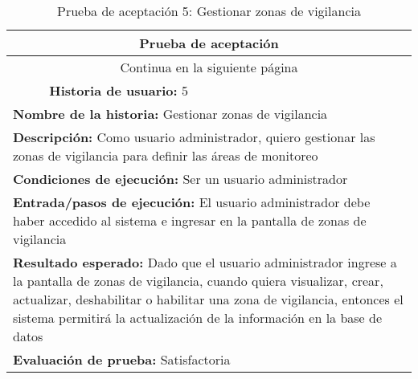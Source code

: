 \begin{longtable}{|p{6.7cm}|p{6.7cm}|}
    \caption{Prueba de aceptación 5: Gestionar zonas de vigilancia} \label{tab:prueba-5}
    \\
    \hline
    \multicolumn{2}{|c|}{\textbf{Prueba de aceptación}}                                                                                                                         \\
    \hline

    \endfirsthead

    \hline
    \endhead

    \hline
    \multicolumn{2}{|c|}{{Continua en la siguiente página}}                                                                                                                     \\
    \hline
    \endfoot

    \hline
    \endlastfoot
    \multicolumn{1}{|p{6.7cm}|}{\textbf{Número} 5 } & \multicolumn{1}{|p{6.7cm}|}{\textbf{Historia de usuario:} 5}                                                              \\
    \hline
    \multicolumn{2}{|p{13.4cm}|}{\textbf{Nombre de la historia:} Gestionar zonas de vigilancia }                                                                                \\
    \hline
    \multicolumn{2}{|p{13.4cm}|}{\textbf{Descripción:} Como usuario administrador, quiero gestionar las zonas de vigilancia para definir las áreas de monitoreo}                \\
    \hline
    \multicolumn{2}{|p{13.4cm}|}{\textbf{Condiciones de ejecución:} Ser un usuario administrador}                                                                               \\
    \hline
    \multicolumn{2}{|p{13.4cm}|}{\textbf{Entrada/pasos de ejecución:} El usuario administrador debe haber accedido al sistema e ingresar en la pantalla de zonas de vigilancia} \\
    \hline
    \multicolumn{2}{|p{13.4cm}|}{\textbf{Resultado esperado:} Dado que el usuario administrador ingrese a la pantalla de zonas de vigilancia, cuando quiera visualizar, crear,
    actualizar, deshabilitar o habilitar una zona de vigilancia, entonces el sistema permitirá la actualización de la información en la base de datos}                          \\
    \hline
    \multicolumn{2}{|p{13.4cm}|}{\textbf{Evaluación de prueba:} Satisfactoria}                                                                                                  \\
    \hline
\end{longtable}


